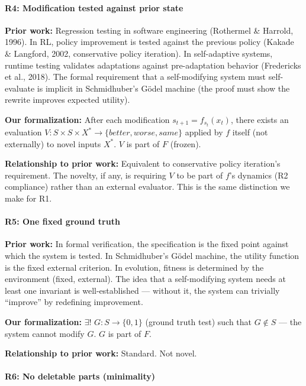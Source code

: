 \documentclass[
  11pt,
]{article}
\begin{document}
\paragraph{R4: Modification tested against prior
state}\label{r4-modification-tested-against-prior-state}

\textbf{Prior work:} Regression testing in software engineering
(Rothermel \& Harrold, 1996). In RL, policy improvement is tested
against the previous policy (Kakade \& Langford, 2002, conservative
policy iteration). In self-adaptive systems, runtime testing validates
adaptations against pre-adaptation behavior (Fredericks et al., 2018).
The formal requirement that a self-modifying system must self-evaluate
is implicit in Schmidhuber's Gödel machine (the proof must show the
rewrite improves expected utility).

\textbf{Our formalization:} After each modification
\(s_{t+1} = f_{s_t}(x_t)\), there exists an evaluation
\(V: S \times S \times X^* \to \{better, worse, same\}\) applied by
\(f\) itself (not externally) to novel inputs \(X^*\). \(V\) is part of
\(F\) (frozen).

\textbf{Relationship to prior work:} Equivalent to conservative policy
iteration's requirement. The novelty, if any, is requiring \(V\) to be
part of \(f\)'s dynamics (R2 compliance) rather than an external
evaluator. This is the same distinction we make for R1.

\paragraph{R5: One fixed ground truth}\label{r5-one-fixed-ground-truth}

\textbf{Prior work:} In formal verification, the specification is the
fixed point against which the system is tested. In Schmidhuber's Gödel
machine, the utility function is the fixed external criterion. In
evolution, fitness is determined by the environment (fixed, external).
The idea that a self-modifying system needs at least one invariant is
well-established --- without it, the system can trivially ``improve'' by
redefining improvement.

\textbf{Our formalization:} \(\exists!\) \(G: S \to \{0, 1\}\) (ground
truth test) such that \(G \notin S\) --- the system cannot modify \(G\).
\(G\) is part of \(F\).

\textbf{Relationship to prior work:} Standard. Not novel.

\paragraph{R6: No deletable parts
(minimality)}\label{r6-no-deletable-parts-minimality}
\end{document}
